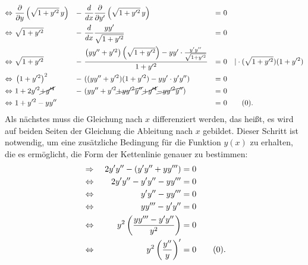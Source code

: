 \begin{align*}
	\Leftrightarrow &\
	\frac{\partial}{\partial y} \left( \sqrt{1 + y'^2} \, y \right) &- &\ \frac{d}{dx} \frac{\partial}{\partial y'} \left( \sqrt{1 + y'^2} \, y \right) 
	&= &\
	0
	\\
	\Leftrightarrow &\
	\sqrt{1 + y'^2} &- &\ \frac{d}{dx} \dfrac{yy'}{\sqrt{1 + y'^2}}
	&= &\
	0
	\\
	\Leftrightarrow &\
	\sqrt{1 + y'^2} &- &\ \frac{\left( y y'' + y'^2 \right) \left( \sqrt{1 + y'^2} \right) - y y' \cdot \frac{y' y''}{\sqrt{1 + y'^2}}}{1 + y'^2}
	&= &\
	0 \quad | \cdot (\sqrt{1 + y'^2})(1 + y'^2)
	\\
	\Leftrightarrow &\
	\left(1 + y'^2\right)^2 &- &\ ((y y'' + y'^2)(1 + y'^2) - y y' \cdot y' y'')
	&= &\
	0
	\\
	\Leftrightarrow &\
	1 + 2y'^2 \cancel{+y'^4} &- &\ (y y'' + y'^2 \cancel{+ yy'^2 y''} \cancel{+ y'^4} \cancel{- yy'^2 y''})
	&= &\
	0
	\\
	\Leftrightarrow &\
	1 + y'^2 - yy'' & &\
	&= &\
	0 \label{kettenlinie:equation_1} \tag{\theequation} \stepcounter{equation}.
\end{align*}
Als nächstes muss die Gleichung nach \(x\) differenziert werden, das heißt, es wird auf beiden Seiten der Gleichung die Ableitung nach \(x\) gebildet.
Dieser Schritt ist notwendig, um eine zusätzliche Bedingung für die Funktion \(𝑦(𝑥)\) zu erhalten, die es ermöglicht, die Form der Kettenlinie genauer zu bestimmen:
\begin{align*}
	&\Rightarrow &\
	2y'y'' - (y'y'' + yy''')
	&=
	0
	\\
	&\Leftrightarrow &\
	2y'y'' - y'y'' - yy'''
	&=
	0
	\\
	&\Leftrightarrow &\
	y'y'' - yy'''
	&=
	0
	\\
	&\Leftrightarrow &\
	yy''' - y'y''
	&=
	0
	\\
	&\Leftrightarrow &\
	y^2 \left(\dfrac{yy''' - y'y''}{y^2}\right)
	&=
	0
	\\
	&\Leftrightarrow &\
	y^2 \left(\dfrac{y''}{y}\right)'
	&=
	0 \label{kettenlinie:equation_2} \tag{\theequation} \stepcounter{equation}.
	\\
\end{align*}


